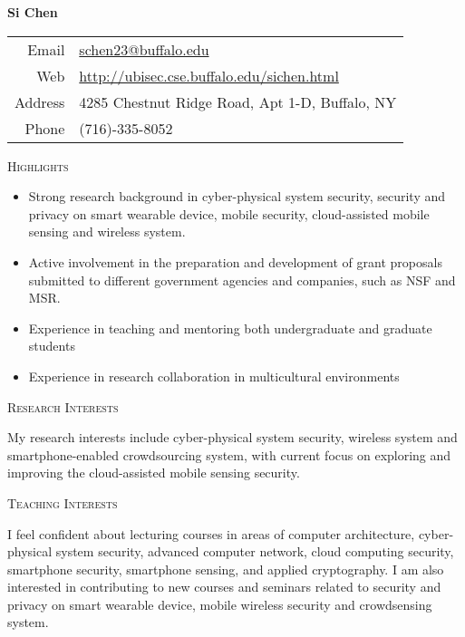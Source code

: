 \documentclass[letter]{article}
\newcommand{\heading}[1]{\item \large \textsc{#1} \normalsize}
\begin{document}
\Huge \textbf{Si Chen} \hfill \small
\begin{tabular}{rl}
Email   & \href{mailto:schen23@buffalo.edu}{schen23@buffalo.edu} \\
Web     & \url{http://ubisec.cse.buffalo.edu/sichen.html} \\
Address & 4285 Chestnut Ridge Road, Apt 1-D, Buffalo, NY\\
Phone  & (716)-335-8052\\
\end{tabular}

\normalsize

\begin{description}

\heading{Highlights}
\begin{itemize}
\item Strong research background in cyber-physical system security, security and privacy on smart wearable device, mobile security, cloud-assisted mobile sensing and wireless system.

\item Active involvement in the preparation and development of grant proposals submitted to different government agencies and companies, such as NSF and MSR.
\item Experience in teaching and mentoring both undergraduate and graduate students
\item Experience in research collaboration in multicultural environments
\end{itemize}


\heading{Research Interests}

My research interests include cyber-physical system security, wireless system and smartphone-enabled crowdsourcing system,  with current focus on exploring and improving the cloud-assisted mobile sensing security. \\

\heading{Teaching Interests}

I feel confident about lecturing courses in areas of  computer architecture, cyber-physical system security, advanced computer network, cloud computing security, smartphone security, smartphone sensing, and applied cryptography. I am also interested in contributing to new courses and seminars related to security and privacy on smart wearable device, mobile wireless security and crowdsensing system.




\end{description}
\end{document}
